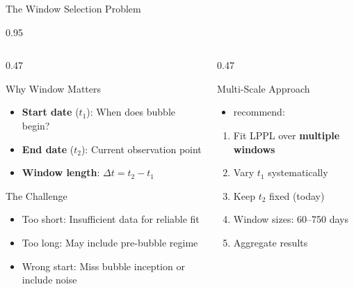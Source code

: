 \documentclass[9pt, aspectratio=169, t]{beamer}
\begin{document}
\begin{frame}{The Window Selection Problem}
    \begin{cminipage}{0.95\textwidth}
    {\footnotesize
    \begin{columns}[T]
        \begin{column}{0.47\textwidth}
            \begin{block}{Why Window Matters}
                \begin{itemize}\setlength{\itemsep}{0pt}
                    \item \textbf{Start date} ($t_1$): When does bubble begin?
                    \item \textbf{End date} ($t_2$): Current observation point
                    \item \textbf{Window length}: $\Delta t = t_2 - t_1$
                \end{itemize}
            \end{block}

            \begin{alertblock}{The Challenge}
                \begin{itemize}\setlength{\itemsep}{0pt}
                    \item Too short: Insufficient data for reliable fit
                    \item Too long: May include pre-bubble regime
                    \item Wrong start: Miss bubble inception or include noise
                \end{itemize}
            \end{alertblock}
        \end{column}
        \begin{column}{0.47\textwidth}
            \begin{exampleblock}{Multi-Scale Approach}
                \begin{itemize}\setlength{\itemsep}{0pt}
                    \item [\href{https://doi.org/10.1142/S2010139215500044}{Sornette et al., 2015}] recommend:
                \end{itemize}
                \begin{enumerate}\setlength{\itemsep}{0pt}
                    \item Fit LPPL over \textbf{multiple windows}
                    \item Vary $t_1$ systematically
                    \item Keep $t_2$ fixed (today)
                    \item Window sizes: 60--750 days
                    \item Aggregate results
                \end{enumerate}
            \end{exampleblock}


\end{column}
\end{columns}}
\end{cminipage}
\end{frame}
\end{document}
